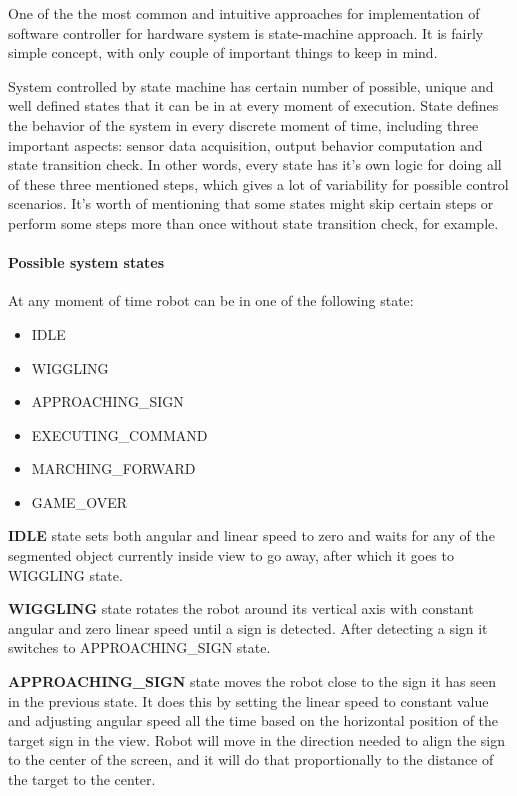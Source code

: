 
One of the the most common and intuitive approaches for implementation of software controller for hardware system is state-machine approach. It is fairly simple concept, with only couple of important things to keep in mind. 

System controlled by state machine has certain number of possible, unique and well defined states that it can be in at every moment of execution. State defines the behavior of the system in every discrete moment of time, including three important aspects: sensor data acquisition, output behavior computation and state transition check. In other words, every state has it\rq{}s own logic for doing all of these three mentioned steps, which gives a lot of variability for possible control scenarios. It\rq{}s worth of mentioning that some states might skip certain steps or perform some steps more than once without state transition check, for example.

\paragraph{Possible system states}

At any moment of time robot can be in one of the following state:

\begin{itemize}
	\item IDLE
	\item WIGGLING
	\item APPROACHING\_SIGN
	\item EXECUTING\_COMMAND
	\item MARCHING\_FORWARD
	\item GAME\_OVER 
\end{itemize}

\textbf{IDLE} state sets both angular and linear speed to zero and waits for any of the segmented object currently inside view to go away, after which it goes to WIGGLING state.

\textbf{WIGGLING} state rotates the robot around its vertical axis with constant angular and zero linear speed until a sign is detected. After detecting a sign it switches to APPROACHING\_SIGN state.

\textbf{APPROACHING\_SIGN} state moves the robot close to the sign it has seen in the previous state. It does this by setting the linear speed to constant value and adjusting angular speed all the time based on the horizontal position of the target sign in the view. Robot will move in the direction needed to align the sign to the center of the screen, and it will do that proportionally to the distance of the target to the center.

